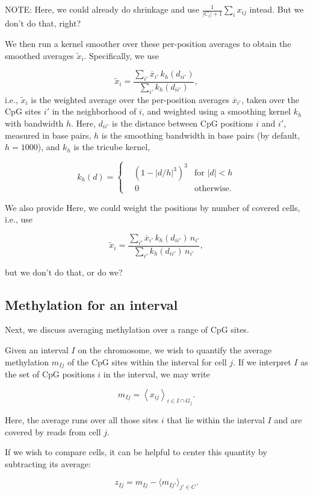 \documentclass[twocolumn,10pt]{article}
\begin{document}
NOTE: Here, we could already do shrinkage and use $\frac{1}{|C_i|+1}\sum_i x_{ij}$ intead. But we don't do that, right?

We then run a kernel smoother over these per-position averages to obtain the smoothed averages $\tilde x_i$. Specifically, we use

\[ \tilde x_i = \frac{\sum_{i'} \overline x_{i'}\, k_h(d_{ii'})}{\sum_{i'} k_h(d_{ii'})},\]
i.e., $\tilde x_i$ is the weighted average over the per-position averages $\overline{x}_{i'}$, taken over the CpG sites $i'$ in the neighborhood of $i$, and weighted using a smoothing kernel $k_h$ with bandwidth $h$. Here, $d_{ii'}$ is the distance between CpG positions $i$ and $i'$, measured in base pairs, $h$ is the smoothing bandwidth in base pairs (by default, $h=1000$), and $k_h$ is the tricube kernel,

\[ k_h(d) = \left\{
\begin{aligned}
	&\left(1-|d/h|^3\right)^3 &\text{for } |d|<h \\
	&\,0 &\text{otherwise}. 
\end{aligned}
\right.
\]

We also provide Here, we could weight the positions by number of covered cells, i.e., use

$$ \tilde x_i = \frac{\sum_{i'} \overline x_{i'}\, k_h(d_{ii'})\, n_{i'}}{\sum_{i'} k_h(d_{ii'})\, n_{i'}},$$

but we don't do that, or do we?


\subsection{Methylation for an interval}

Next, we discuss averaging methylation over a range of CpG sites.

Given an interval $I$ on the chromosome, we wish to quantify the average methylation $m_{Ij}$ of the CpG sites within the interval for cell $j$. If we interpret $I$ as the set of CpG positions $i$ in the interval, we may write

$$ m_{Ij} = \left< x_{ij} \right>_{i\in I\cap G_j}.$$

Here, the average runs over all those sites $i$ that lie within the interval $I$ and are covered by reads from cell $j$.

If we wish to compare cells, it can be helpful to center this quantity by subtracting its average:

$$ z_{Ij} = m_{Ij} - \langle m_{Ij'}\rangle_{j'\in C}.$$
\end{document}
